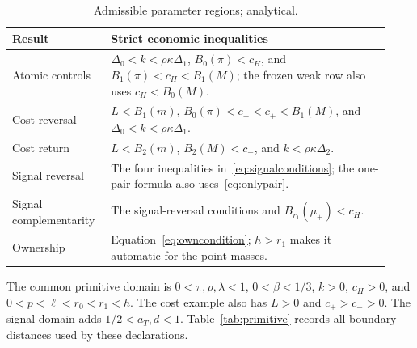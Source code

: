 \documentclass[12pt]{article}
\begin{document}
\begin{table}[htbp]\centering\small
\caption{Admissible parameter regions; analytical.}
\begin{tabular}{@{}p{0.23\linewidth}p{0.70\linewidth}@{}}\toprule
Result & Strict economic inequalities\\\midrule
Atomic controls & $\Delta_0<k<\rho\kappa\Delta_1$, $B_0(\pi)<c_H$, and $B_1(\pi)<c_H< B_1(M)$; the frozen weak row also uses $c_H<B_0(M)$.\\
Cost reversal & $L<B_1(m)$, $B_0(\pi)<c_-<c_+<B_1(M)$, and $\Delta_0<k<\rho\kappa\Delta_1$.\\
Cost return & $L<B_2(m)$, $B_2(M)<c_-$, and $k<\rho\kappa\Delta_2$.\\
Signal reversal & The four inequalities in~\eqref{eq:signalconditions}; the one-pair formula also uses~\eqref{eq:onlypair}.\\
Signal complementarity & The signal-reversal conditions and $B_{r_1}(\mu_+)<c_H$.\\
Ownership & Equation~\eqref{eq:owncondition}; $h>r_1$ makes it automatic for the point masses.\\\bottomrule
\end{tabular}
\end{table}

The common primitive domain is $0<\pi,\rho,\lambda<1$, $0<\beta<1/3$, $k>0$, $c_H>0$, and $0<p<\ell<r_0<r_1<h$.
The cost example also has $L>0$ and $c_+>c_->0$.
The signal domain adds $1/2<a_T,d<1$.
Table~\ref{tab:primitive} records all boundary distances used by these declarations.
\end{document}
